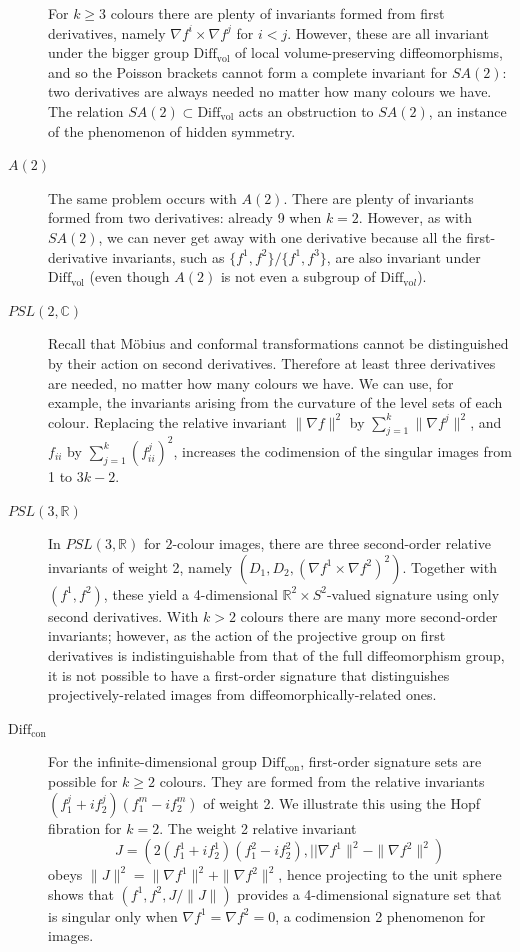 \documentclass[review,onefignum,onetabnum]{siamonline190516}
\begin{document}
\begin{description}
For $k\ge 3$ colours there are plenty of invariants formed from first derivatives, namely $\nabla f^i \times \nabla f^j$ for $i<j$. However, these are all invariant under the bigger group $\mathrm{Diff}_{\mathrm{vol}}$ of local volume-preserving diffeomorphisms, and so the Poisson brackets cannot form a complete invariant for $SA(2)$: two derivatives are always needed no matter how many colours we have. The relation $SA(2)\subset \mathrm{Diff}_{\mathrm{vol}}$ acts an obstruction to $SA(2)$, an instance of the phenomenon of hidden symmetry.
\item[$A(2)$]
The same problem occurs with $A(2)$. There are plenty of invariants formed from two derivatives: already 9 when $k=2$. However, as with $SA(2)$, we can never get away with one derivative because all the first-derivative invariants, such as $\{f^1,f^2\}/\{f^1,f^3\}$, are also invariant under $\mathrm{Diff}_{\mathrm{vol}}$ (even though $A(2)$ is not even a subgroup of $\mathrm{Diff}_{\mathrm{vo}l}$).
\item[$PSL(2,\mathbb{C})$]
Recall that M\"obius and conformal transformations cannot be distinguished by their action on second derivatives. Therefore at least three derivatives are needed, no matter how many colours we have. We can use, for example, the invariants arising from the curvature of the level sets of each colour. Replacing the relative invariant $\|\nabla f\|^2$ by $\sum_{j=1}^k \|\nabla f^j\|^2$, and $f_{ii}$ by $\sum_{j=1}^k (f^j_{ii})^2$, increases the codimension of the singular images from 1 to $3k-2$.
\item[$PSL(3,\mathbb{R})$]
In $PSL(3, \mathbb{R})$ for $2$-colour images, there are three second-order relative invariants of weight 2, namely $(D_1,D_2,(\nabla f^1\times \nabla f^2)^2)$. Together with $(f^1,f^2)$, these yield a 4-dimensional $\mathbb{R}^2\times S^2$-valued signature using only second derivatives. With $k>2$ colours there are many more second-order invariants; however, as the action of the projective group on first derivatives is indistinguishable from that of the full diffeomorphism group, it is not possible to have a first-order signature that distinguishes projectively-related images from diffeomorphically-related ones.
\item[$\mathrm{Diff}_{\mathrm{con}}$]
For the infinite-dimensional group $\mathrm{Diff}_{\mathrm{con}}$, first-order signature sets are possible for $k \ge 2$ colours. They are formed from the relative invariants $(f^j_1 + i f^j_2)(f^m_1 - i f^m_2)$ of weight 2. We illustrate this using the Hopf fibration for $k=2$. The weight 2 relative invariant $$J = (2(f^1_1 + i f^1_2)(f^2_1 - i f^2_2), ||\nabla f^1\|^2 - \|\nabla f^2\|^2)$$ obeys $\|J\|^2 = \|\nabla f^1\|^2 + \|\nabla f^2\|^2$, hence projecting to the unit sphere shows that $(f^1,f^2,J/\|J\|)$ provides a 4-dimensional signature set that is singular only when $\nabla f^1 = \nabla f^2 = 0$, a codimension 2 phenomenon for images.
\end{description}
\end{document}
